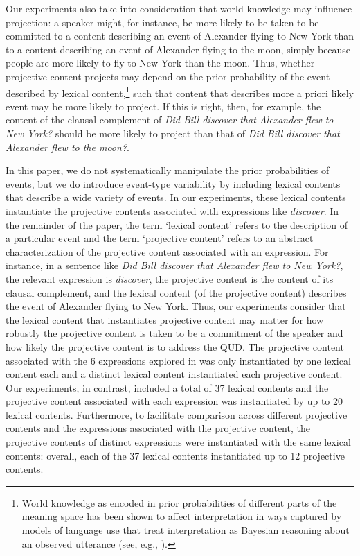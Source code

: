 \documentclass[11pt,fleqn]{article}
\newcommand{\6}{\mbox{$[\hspace*{-.6mm}[$}}
\newcommand{\9}{\mbox{$]\hspace*{-.6mm}]$}}
\begin{document}
Our experiments also take into consideration that world knowledge may influence projection: a speaker might, for instance, be more likely to be taken to be committed to a content describing an event of Alexander flying to New York than to a content describing an event of Alexander flying to the moon, simply because people are more likely to fly to New York than the moon. Thus, whether projective content projects may depend on the prior probability of the event described by lexical content,\footnote{World knowledge as encoded in prior probabilities of different parts of the meaning space has been shown to affect interpretation in ways captured by models of language use that treat interpretation as Bayesian reasoning about an observed utterance (see, e.g., \citealt{frankejaeger2016, goodmanfrank2016}).} such that content that describes more a priori likely event may be more likely to project. If this is right, then, for example, the content of the clausal complement of {\em Did Bill discover that Alexander flew to New York?} should be more likely to project than that of {\em Did Bill discover that Alexander flew to the moon?}. 

In this paper, we do not systematically manipulate the prior probabilities of events, but we do introduce event-type variability by including lexical contents that describe a wide variety of events. In our experiments, these lexical contents instantiate the projective contents associated with expressions like {\em discover}. In the remainder of the paper, the term `lexical content' refers to the description of a particular event and the term `projective content' refers to an abstract characterization of the projective content associated with an expression. For instance, in  a sentence like {\em Did Bill discover that Alexander flew to New York?}, the relevant expression is {\em discover}, the projective content is the content of its clausal complement, and the lexical content (of the projective content) describes the event of Alexander flying to New York.  Thus, our experiments consider that the lexical content that instantiates projective content may matter for how robustly the projective content is taken to be a commitment of the speaker and how likely the projective content is to address the QUD. The projective content associated with the 6 expressions explored in \citealt{smith-hall11} was only instantiated by one lexical content each and a distinct lexical content instantiated each projective content. Our experiments, in contrast, included a total of 37 lexical contents and the projective content associated with each expression was instantiated by up to 20 lexical contents. Furthermore, to facilitate comparison across different projective contents and the expressions associated with the projective content, the projective contents of distinct expressions were instantiated with the same lexical contents: overall, each of the 37 lexical contents instantiated up to 12 projective contents.
\end{document}

